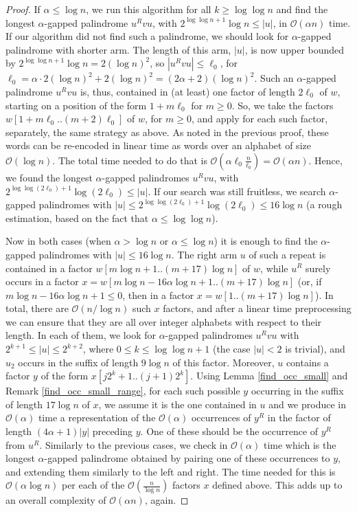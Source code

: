 \documentclass[final]{dmtcs-episciences}
\newcommand{\bigo}{{\mathcal O}}
\begin{document}
\begin{proof}
If $\alpha \leq \log n$, we run this algorithm for all $k\geq \log \log n$ and find the longest $\alpha$-gapped palindrome $u^Rvu$, with $2^{\log\log n+1} \log n \leq |u|$, in $\bigo(\alpha n)$ time. If our algorithm did not find such a palindrome, we should look for $\alpha$-gapped palindrome with shorter arm. The length of this arm, $|u|$, is now upper bounded by $2^{\log\log n +1}\log n=2 (\log n)^2$, so $|u^Rvu|\leq \ell_0$, for $\ell_0=\alpha\cdot 2(\log n)^2+2(\log n)^2=(2\alpha+2)(\log n)^2$. Such an $\alpha$-gapped palindrome $u^Rvu$ is, thus, contained in (at least) one factor of length $ 2\ell_0$ of $w$, starting on a position of the form $1+m\ell_0$ for $m\geq 0$.  So, we take the factors $w[1+m\ell_0..(m+2)\ell_0]$ of $w$, for $m\geq 0$, and apply for each such factor, separately, the same strategy as above. As noted in the previous proof, these words can be re-encoded in linear time as words over an alphabet of size $\bigo(\log n)$. The total time needed to do that is $\bigo\left(\alpha\ell_0 \frac{n}{\ell_0}\right)=\bigo(\alpha n)$. Hence, we found the longest $\alpha$-gapped palindromes $u^Rvu$, with $2^{\log \log (2\ell_0) +1} \log (2\ell_0) \leq |u| $. If our search was still fruitless, we search $\alpha$-gapped palindromes with $|u|\leq 2^{\log \log (2\ell_0) +1} \log (2\ell_0)\leq 16\log n$ (a rough estimation, based on the fact that $\alpha\leq \log \log n$). 

Now in both cases (when $\alpha > \log n$ or $\alpha \leq \log n$) it is enough to find the $\alpha$-gapped palindromes with $|u|\leq 16 \log n$. The right arm $u$ of such a repeat is contained in a factor $w[m\log n+1.. (m+17)\log n]$ of $w$, while $u^R$ surely occurs in a factor $x=w[m\log n-16\alpha\log n+1.. (m+17)\log n]$ (or, if $m\log n-16\alpha\log n+1\leq 0$, then in a factor $x=w[1.. (m+17)\log n]$). In total, there are $\bigo(n/ \log n)$ such $x$ factors, and after a linear time preprocessing we can ensure that they are all over integer alphabets with respect to their length. In each of them, we look for $\alpha$-gapped palindromes $u^Rvu$ with $2^{k+1}\leq |u|\leq 2^{k+2}$, where $0\leq k\leq \log\log n + 1$ (the case $|u|<2$ is trivial), and $u_2$ occurs in the suffix of length $9\log n$ of this factor. Moreover, $u$ contains a factor $y$ of the form $x[j2^k+1..(j+1)2^{k}]$. Using Lemma \ref{find_occ_small} and Remark \ref{find_occ_small_range}, 
for each such possible $y$ occurring in the suffix of length $17\log n$ of $x$, we assume it is the one contained in $u$ and we produce in $\bigo(\alpha)$ time a representation of the $\bigo(\alpha)$ occurrences of $y^R$ in the factor of length $(4\alpha+1) |y|$ preceding $y$. One of these should be the occurrence of $y^R$ from $u^R$. Similarly to the previous cases, we check in $\bigo(\alpha)$ time which is the longest $\alpha$-gapped palindrome obtained by pairing one of these occurrences to $y$, and extending them similarly to the left and right. The time needed for this is $\bigo(\alpha \log n)$ per each of the $\bigo(\frac{n}{\log n})$ factors $x$ defined above. 
This adds up to an overall complexity of $\bigo(\alpha n)$, again.


\end{proof}
\end{document}

